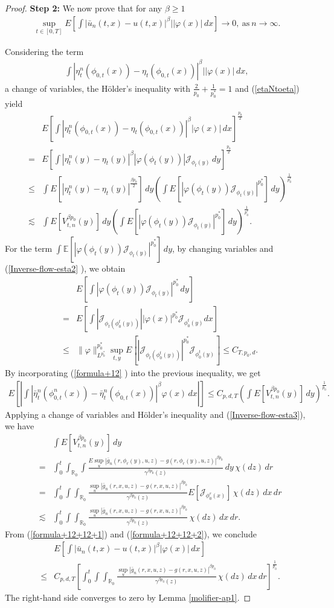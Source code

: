 \documentclass[12pt,oneside, reqno]{amsart}
\newcommand{\be}{\begin{eqnarray}}
\newcommand{\ee}{\end{eqnarray}}
\newcommand{\ce}{\begin{eqnarray*}}
\newcommand{\de}{\end{eqnarray*}}
\def\no{\nonumber}
\def\cJ{{\mathcal J}}
\def\mE{{\mathbb E}}
\def\mR{{\mathbb R}}
\def\geq{\geqslant}
\def\leq{\leqslant}
\numberwithin{equation}{section}
\begin{document}
\begin{proof}
\textbf{Step 2:}  We now prove that for any $\beta\geq 1$
\be\label{solutin-conv1+1}
\sup_{t\in[0,T]}E\left[\int |\bar{u}_n(t,x) - u(t,x)|^\beta||\varphi(x)| \,dx\right]\to 0,~\mbox{as}~n\to \infty.
\ee 

Considering the term
\ce 
\int \left|\eta_t^n(\phi_{0,t}(x))-\eta_t(\phi_{0,t}(x))\right|^\beta||\varphi(x)|\, dx,
\de 
a change of variables, the H\"{o}lder's inequality with $\frac{2}{p_0}+\frac{1}{p_0^*}=1$ and (\ref{etaNtoeta}) yield 
\ce 
&&E\left[\int \left|\eta_t^n(\phi_{0,t}(x))-\eta_t(\phi_{0,t}(x))\right|^\beta|\varphi(x)|\, dx\right]^{\frac{p_0}{2}}\\
&=&E\left[\int \left|\eta_t^n(y)-\eta_t(y)\right|^\beta|\varphi(\phi_{t}(y))|\cJ_{\phi_{t}(y)}\, dy\right]^{\frac{p_0}{2}}\\
&\leq&\int E\left[ \left|\eta_t^n(y)-\eta_t(y)\right|^{\frac{\beta p_0}{2}}\right]\,dy\left(\int E[|\varphi(\phi_{t}(y))\cJ_{\phi_{t}(y)}|^{p_0^*}]\, dy\right)^{\frac{1}{p_0^*}}\\
&\lesssim &\int E[ V_{t,n}^{\beta p_0}(y)]\,dy\left(\int E[|\varphi(\phi_{t}(y))\cJ_{\phi_{t}(y)}|^{p_0^*}]\, dy\right)^{\frac{1}{p_0^*}}.
\de 
For the term $\int\mE[|\varphi(\phi_{t}(y))\cJ_{\phi_{t}(y)}|^{p_0^*}]\, dy$, by  changing variables   and (\ref{Inverse-flow-esta2} ), we obtain 
\be\label{formula+12}
&&E\left[\int|\varphi(\phi_{t}(y))\cJ_{\phi_{t}(y)}|^{p_0^*}\, dy\right]\no\\
&=&E\left[\int|\cJ_{\phi_{t}(\phi_0^{t}(y))}||\varphi(x)|^{p_0^*}\cJ_{\phi_0^{t}(y)} dx\right]\no\\
&\leq &\|\varphi\|_{L^{p_0^*}}^{p_0^*} \sup_{t,y}E[|\cJ_{\phi_{t}(\phi_0^{t}(y))}|^{p_0^*}\cJ_{\phi_0^{t}(y)}]\leq C_{T,p_0,d}.
\ee
By incorporating (\ref{formula+12} )  into the previous inequality, we get
\be\label{formula+12+12+1} 
E\left[\left|\int \left|\bar\eta_t^n(\phi_{0,t}^n(x))-\bar\eta_t^n(\phi_{0,t}(x))\right|^\beta\varphi(x)\, dx\right|\right]
\leq C_{p,d,T} \left(\int E [V_{t,n}^{\beta p_0}(y)]\,dy\right)^{\frac{1}{p_0}}.
\ee
Applying a change of variables  and  H\"{o}lder's inequality and (\ref{Inverse-flow-esta3}), we have
\be\label{formula+12+12+2}  
&&\int E [V_{t,n}^{\beta p_0}(y)]\,dy\no\\
&=& \int_0^t\int_{\mR_0}\int \frac{E\sup_u|\bar{g}_n(r,\phi_{r}(y),u,z)-g(r,\phi_{r}(y),u,z)|^{\beta p_0}}{\gamma^{\beta p_0}(z)}\,dy\,\chi(dz)\,dr\no\\
&=& \int_0^t\int\int_{\mR_0} \frac{\sup_u|\bar{g}_n(r,x,u,z)-g(r,x,u,z)|^{\beta  p_0}}{\gamma^{\beta p_0}(z)}E[\cJ_{\phi_0^{r}(x)}]\,\chi(dz)\,dx\,dr\no\\
&\lesssim& \int_0^t\int\int_{\mR_0} \frac{\sup_u|\bar{g}_n(r,x,u,z)-g(r,x,u,z)|^{\beta p_0}}{\gamma^{\beta p_0}(z)}\,\chi(dz)\,dx\,dr.\no
\ee
From (\ref{formula+12+12+1}) and (\ref{formula+12+12+2}), we conclude
\be\label{weck-convergece1+2}
&&E\left[\int |\bar{u}_n(t,x)- u(t,x)|^\beta|\varphi(x)| \,dx\right]\no\\
&\leq& C_{p,d,T} \left[\int_0^t\int\int_{\mR_0} \frac{\sup_u|\bar{g}_n(r,x,u,z)-g(r,x,u,z)|^{\beta p_0}}{\gamma^{\beta p_0}(z)}\,\chi(dz)\,dx\,dr\right]^{\frac{1}{p_0}}.
\ee 
The right-hand side converges to zero by Lemma  \ref{molifier-ap1}.




\end{proof}
\end{document}
